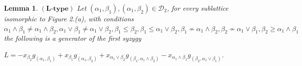 \documentclass[10pt,reqno]{amsart}
\numberwithin{equation}{section}
\newtheorem{lemma}[theorem]{Lemma}
\begin{document}
 
\begin{lemma}\label{L_1} $(\textbf{L-type})$ Let $(\alpha_1,\beta_1),(\alpha_1,\beta_2) \in \mathcal{D}_2$, for every sublattice 
 isomorphic to Figure 2.(a), with conditions $\alpha_1 \wedge \beta_1 \neq \alpha_1 \wedge \beta_2,
 \alpha_1 \vee \beta_1 \neq \alpha_1 \vee \beta_2, \beta_1 \leq \beta_2,\beta_1 \leq \alpha_1 \vee \beta_2,\beta_1 
 \nsim \alpha_1 \wedge \beta_2, \beta_2 \nsim \alpha_1 \vee \beta_1,\beta_2 \geq \alpha_1 \wedge \beta_1$ the 
 following is a generator of the first syzygy

\begin{center}
 $L=-x_{\beta_2}g_{(\alpha_1,\beta_1)} +x_{\beta_1}g_{(\alpha_1,\beta_2)} 
 + x_{\alpha_1 \vee \beta_2}g_{(\beta_1,\alpha_1 \wedge \beta_2)}
 - x_{\alpha_1 \wedge \beta_1}g_{(\beta_2, \alpha_1 \vee \beta_1)}$.
\end{center} 
\end{lemma}
\end{document}
